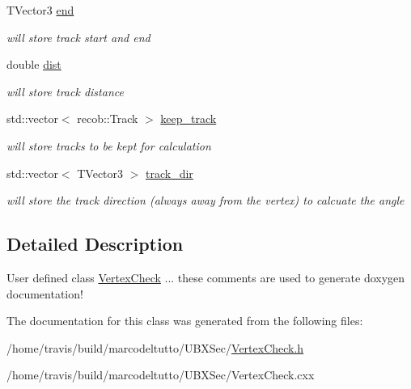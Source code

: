 \begin{DoxyCompactItemize}
\item 
\hypertarget{classubxsec_1_1VertexCheck_ad416fe53ee649eb9a9e310e9abe32a0b}{\-T\-Vector3 \hyperlink{classubxsec_1_1VertexCheck_ad416fe53ee649eb9a9e310e9abe32a0b}{end}}\label{classubxsec_1_1VertexCheck_ad416fe53ee649eb9a9e310e9abe32a0b}

\begin{DoxyCompactList}\small\item\em will store track start and end \end{DoxyCompactList}\item 
\hypertarget{classubxsec_1_1VertexCheck_aaa817d271e0bb5e44d07ef5c21ad52cc}{double \hyperlink{classubxsec_1_1VertexCheck_aaa817d271e0bb5e44d07ef5c21ad52cc}{dist}}\label{classubxsec_1_1VertexCheck_aaa817d271e0bb5e44d07ef5c21ad52cc}

\begin{DoxyCompactList}\small\item\em will store track distance \end{DoxyCompactList}\item 
\hypertarget{classubxsec_1_1VertexCheck_a6046f472792f70321896604580b758e6}{std\-::vector$<$ recob\-::\-Track $>$ \hyperlink{classubxsec_1_1VertexCheck_a6046f472792f70321896604580b758e6}{keep\-\_\-track}}\label{classubxsec_1_1VertexCheck_a6046f472792f70321896604580b758e6}

\begin{DoxyCompactList}\small\item\em will store tracks to be kept for calculation \end{DoxyCompactList}\item 
\hypertarget{classubxsec_1_1VertexCheck_a037d7571e3f32aee10ccf100e3a34931}{std\-::vector$<$ \-T\-Vector3 $>$ \hyperlink{classubxsec_1_1VertexCheck_a037d7571e3f32aee10ccf100e3a34931}{track\-\_\-dir}}\label{classubxsec_1_1VertexCheck_a037d7571e3f32aee10ccf100e3a34931}

\begin{DoxyCompactList}\small\item\em will store the track direction (always away from the vertex) to calcuate the angle \end{DoxyCompactList}\end{DoxyCompactItemize}


\subsection{\-Detailed \-Description}
\-User defined class \hyperlink{classubxsec_1_1VertexCheck}{\-Vertex\-Check} ... these comments are used to generate doxygen documentation! 

\-The documentation for this class was generated from the following files\-:\begin{DoxyCompactItemize}
\item 
/home/travis/build/marcodeltutto/\-U\-B\-X\-Sec/\hyperlink{VertexCheck_8h}{\-Vertex\-Check.\-h}\item 
/home/travis/build/marcodeltutto/\-U\-B\-X\-Sec/\-Vertex\-Check.\-cxx\end{DoxyCompactItemize}
